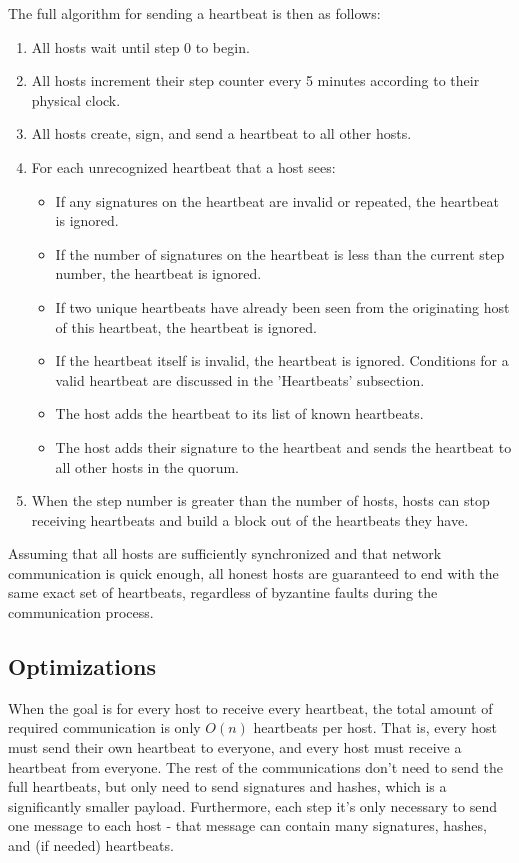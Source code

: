 \documentclass[twocolumn]{article}
\begin{document}
The full algorithm for sending a heartbeat is then as follows:
\begin{enumerate}
	\item All hosts wait until step 0 to begin.
	\item All hosts increment their step counter every 5 minutes according to their physical clock.
	\item All hosts create, sign, and send a heartbeat to all other hosts.
	\item For each unrecognized heartbeat that a host sees:
	\begin{itemize}
		\item If any signatures on the heartbeat are invalid or repeated, the heartbeat is ignored.
		\item If the number of signatures on the heartbeat is less than the current step number, the heartbeat is ignored.
		\item If two unique heartbeats have already been seen from the originating host of this heartbeat, the heartbeat is ignored.
		\item If the heartbeat itself is invalid, the heartbeat is ignored. Conditions for a valid heartbeat are discussed in the 'Heartbeats' subsection.
		\item The host adds the heartbeat to its list of known heartbeats.
		\item The host adds their signature to the heartbeat and sends the heartbeat to all other hosts in the quorum.
	\end{itemize}
	\item When the step number is greater than the number of hosts, hosts can stop receiving heartbeats and build a block out of the heartbeats they have.
\end{enumerate}
Assuming that all hosts are sufficiently synchronized and that network communication is quick enough, all honest hosts are guaranteed to end with the same exact set of heartbeats, regardless of byzantine faults during the communication process.


\subsection{Optimizations}
When the goal is for every host to receive every heartbeat, the total amount of required communication is only $O(n)$ heartbeats per host.
That is, every host must send their own heartbeat to everyone, and every host must receive a heartbeat from everyone.
The rest of the communications don't need to send the full heartbeats, but only need to send signatures and hashes, which is a significantly smaller payload.
Furthermore, each step it's only necessary to send one message to each host - that message can contain many signatures, hashes, and (if needed) heartbeats.
\end{document}
